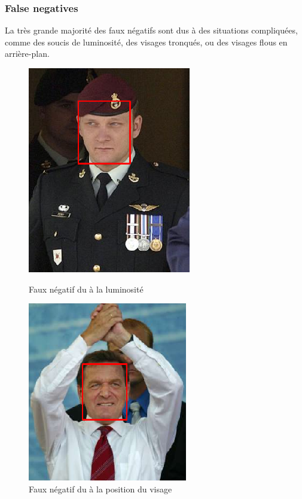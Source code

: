 \documentclass[a4paper,11pt]{article}
\begin{document}
	    \subsubsection{False negatives}
	    
	    La très grande majorité des faux négatifs sont dus à des situations compliquées, comme des soucis de luminosité, des visages tronqués, ou des visages flous en arrière-plan.\\
	    
	    \begin{figure}[H]
	        \centering
	        \begin{minipage}[c]{0.45\linewidth}
	            \begin{center}
	                \includegraphics[scale=0.45]{facenetFN1.png}
	                \caption{Faux négatif du à la luminosité}
	            \end{center}
	        \end{minipage} \hfill
	        \begin{minipage}[c]{0.50\linewidth}
	            \begin{center}
	                \includegraphics[scale=0.47]{facenetFN2.png}
	                \caption{Faux négatif du à la position du visage}
	            \end{center}
	        \end{minipage}
	    \end{figure}
	    
\end{document}
